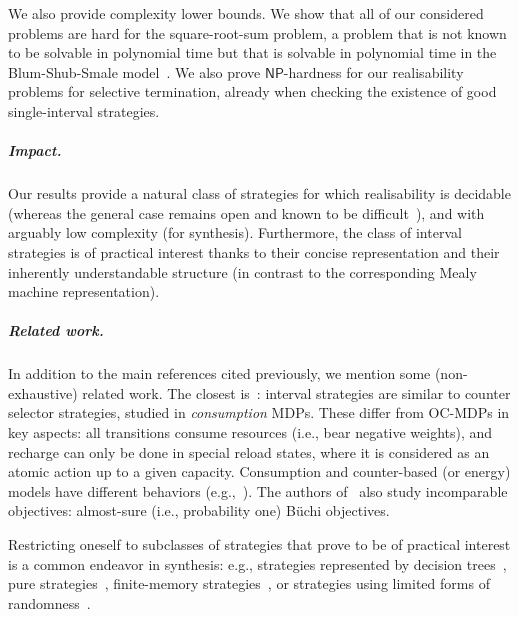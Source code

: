 \documentclass[a4paper,UKenglish,cleveref,autoref,thm-restate,colorlinks]{lipics-v2021}
\newcommand{\np}{\textsf{NP}}
\begin{document}
We also provide complexity lower bounds.
We show that all of our considered problems are hard for the square-root-sum problem, a problem that is not known to be solvable in polynomial time but that is solvable in polynomial time in the Blum-Shub-Smale model~\cite{DBLP:journals/jc/Tiwari92}.
We also prove $\np$-hardness for our realisability problems for selective termination, already when checking the existence of good single-interval strategies.


\subparagraph*{Impact.} Our results provide a natural class of strategies for which realisability is decidable (whereas the general case remains open and known to be difficult~\cite{DBLP:journals/theoretics/PiribauerB24}), and with arguably low complexity (for synthesis). Furthermore, the class of interval strategies is of practical interest thanks to their concise representation and their inherently understandable structure (in contrast to the corresponding Mealy machine representation).

\subparagraph*{Related work.} In addition to the main references cited previously, we mention some (non-exhaustive) related work. The closest is~\cite{DBLP:conf/cav/BlahoudekB0OTT20}: interval strategies are similar to counter selector strategies, studied in \textit{consumption} MDPs. These differ from OC-MDPs in key aspects: all transitions consume resources (i.e., bear negative weights), and recharge can only be done in special reload states, where it is considered as an atomic action up to a given capacity. Consumption and counter-based (or energy) models have different behaviors (e.g.,~\cite{DBLP:conf/cav/BrazdilCKN12}). The authors of~\cite{DBLP:conf/cav/BlahoudekB0OTT20} also study incomparable objectives: almost-sure (i.e., probability one) B\"uchi objectives.

Restricting oneself to subclasses of strategies that prove to be of practical interest is a common endeavor in synthesis: e.g., strategies represented by decision trees~\cite{DBLP:conf/cav/BrazdilCCFK15,DBLP:conf/tacas/BrazdilCKT18,DBLP:conf/tacas/AshokJKWWY21,DBLP:journals/sttt/JungermannKW23}, pure strategies~\cite{DBLP:conf/stacs/Gimbert07,DBLP:conf/tacas/DelgrangeKQR20,DBLP:journals/lmcs/BouyerORV23}, finite-memory strategies~\cite{DBLP:journals/acta/ChatterjeeRR14,DBLP:conf/fsttcs/BouyerRV22,DBLP:journals/lmcs/BouyerORV23}, or strategies using limited forms of randomness~\cite{DBLP:journals/iandc/MainR24,MR25}.
\end{document}
